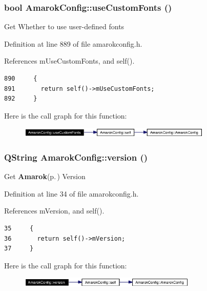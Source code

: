 \subsubsection{\setlength{\rightskip}{0pt plus 5cm}bool Amarok\-Config::use\-Custom\-Fonts ()\hspace{0.3cm}{\tt  [inline, static]}}\label{classAmarokConfig_AmarokConfige92}


Get Whether to use user-defined fonts 

Definition at line 889 of file amarokconfig.h.

References m\-Use\-Custom\-Fonts, and self().



\footnotesize\begin{verbatim}890     {
891       return self()->mUseCustomFonts;
892     }
\end{verbatim}\normalsize 


Here is the call graph for this function:\begin{figure}[H]
\begin{center}
\leavevmode
\includegraphics[width=261pt]{classAmarokConfig_AmarokConfige92_cgraph}
\end{center}
\end{figure}
\subsubsection{\setlength{\rightskip}{0pt plus 5cm}QString Amarok\-Config::version ()\hspace{0.3cm}{\tt  [inline, static]}}\label{classAmarokConfig_AmarokConfige2}


Get {\bf Amarok}{\rm (p.\,\pageref{namespaceAmarok})} Version 

Definition at line 34 of file amarokconfig.h.

References m\-Version, and self().



\footnotesize\begin{verbatim}35     {
36       return self()->mVersion;
37     }
\end{verbatim}\normalsize 


Here is the call graph for this function:\begin{figure}[H]
\begin{center}
\leavevmode
\includegraphics[width=240pt]{classAmarokConfig_AmarokConfige2_cgraph}
\end{center}
\end{figure}
